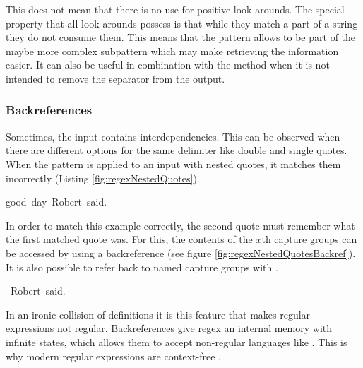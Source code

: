 This does not mean that there is no use for positive look-arounds. The special property that all look-arounds possess is that while they match a part of a string they do not consume them. This means that the pattern  allows  to be part of the maybe more complex subpattern  which may make retrieving the information easier. It can also be useful in combination with the  method when it is not intended to remove the separator from the output.

\subsubsection{Backreferences}

Sometimes, the input contains interdependencies. This can be observed when there are different options for the same delimiter like double and single quotes. When the pattern  is applied to an input with nested quotes, it matches them incorrectly (Listing \ref{fig:regexNestedQuotes}).

\begin{listingBox}[title={Nested Quotes matched incorrectly by \pattern{("|').*?("|')}},label=fig:regexNestedQuotes,width=14cm,center]
    good~day~Robert~said.
\end{listingBox}


In order to match this example correctly, the second quote must remember what the first matched quote was. For this, the contents of the $x$th capture groups can be accessed by using a backreference  (see figure \ref{fig:regexNestedQuotesBackref}). It is also possible to refer back to named capture groups with .

\begin{listingBox}[title={Nested Quotes matched correctly by \pattern{("|').*?\bs 1}},label=fig:regexNestedQuotesBackref,width=14cm,center]
    ~Robert~said.
\end{listingBox}

In an ironic collision of definitions it is this feature that makes regular expressions not regular. Backreferences give regex an internal memory with infinite states, which allows them to accept non-regular languages like . This is why modern regular expressions are context-free \cite{regexIsContextFree}.


